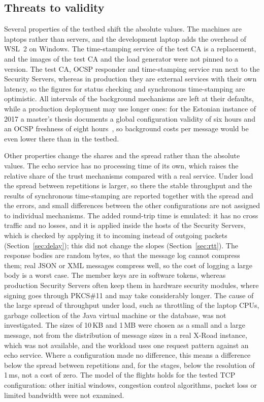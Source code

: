 \documentclass[conference,a4paper]{IEEEtran}
\newcommand{\newtext}[1]{{\color{blue}#1}}
\begin{document}
\subsection{\newtext{Threats to validity}}\label{sec:threats}

Several properties of the testbed shift the absolute values. The machines are laptops rather than
servers, and the development laptop adds the overhead of WSL~2 on Windows. The time-stamping service
of the test CA is a replacement, and the images of the test CA and the load generator were not pinned
to a version. The test CA, OCSP
responder and time-stamping service run next to the Security Servers, whereas in production they are
external services with their own latency, so the figures for status checking and synchronous
time-stamping are optimistic. All intervals of the background mechanisms are left at their defaults,
while a production deployment may use longer ones: for the Estonian instance of 2017 a master's
thesis documents a global configuration validity of six hours and an OCSP freshness of eight
hours~\cite{mironova2017}, so background costs per message would be even lower there than in the
testbed.

Other properties change the shares and the spread rather than the absolute values. The echo service
has no processing time of its own, which raises the relative share of the trust mechanisms compared
with a real service. Under load the spread between repetitions is larger, so there the stable
throughput and the results of synchronous time-stamping are reported together with the spread and
the errors, and small differences between the other configurations are not assigned to individual
mechanisms. The added round-trip time is emulated:
it has no cross traffic and no losses, and it is applied inside the hosts of the Security
Servers\newtext{, which is checked by applying it to incoming instead of outgoing packets
(Section~\ref{sec:delay})}\newtext{; this did not change the slopes (Section~\ref{sec:rtt})}.
\newtext{The response bodies are random bytes, so that the message log cannot compress them; real
JSON or XML messages compress well, so the cost of logging a large body is a worst case. The member
keys are in software tokens, whereas production Security Servers often keep them in hardware
security modules, where signing goes through PKCS\#11 and may take considerably longer. The cause of
the large spread of throughput under load, such as throttling of the laptop CPUs, garbage collection
of the Java virtual machine or the database, was not investigated.} \newtext{The sizes of 10\,KB and
1\,MB were chosen as a small and a large message, not from the distribution of message sizes in a real
X-Road instance, which was not available, and the workload uses one request pattern against an echo
service. Where a configuration made no difference, this means a difference below the spread between
repetitions and, for the stages, below the resolution of 1\,ms, not a cost of zero. The model of the
flights holds for the tested TCP configuration: other initial windows, congestion control algorithms,
packet loss or limited bandwidth were not examined.}
\end{document}
